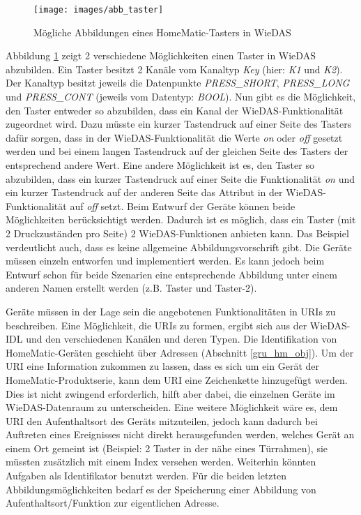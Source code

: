 \begin{figure}[h]
\texttt{[image: images/abb\_taster]}
\caption{Mögliche Abbildungen eines HomeMatic-Tasters in WieDAS}
\label{abb_taster}
\end{figure}

Abbildung \ref{abb_taster} zeigt 2 verschiedene Möglichkeiten einen Taster in WieDAS abzubilden.
Ein Taster besitzt 2 Kanäle vom Kanaltyp \emph{Key} (hier: \emph{K1} und \emph{K2}).
Der Kanaltyp besitzt jeweils die Datenpunkte \emph{PRESS\_SHORT}, \emph{PRESS\_LONG} und
\emph{PRESS\_CONT} \cite{hmscript4} (jeweils vom Datentyp: \emph{BOOL}).
Nun gibt es die Möglichkeit, den Taster entweder so abzubilden, dass ein Kanal der WieDAS-Funktionalität
zugeordnet wird.
Dazu müsste ein kurzer Tastendruck auf einer Seite des Tasters dafür sorgen, dass in der WieDAS-Funktionalität
die Werte \emph{on} oder \emph{off} gesetzt werden und bei einem langen Tastendruck auf der gleichen Seite
des Tasters der entsprechend andere Wert.
Eine andere Möglichkeit ist es, den Taster so abzubilden, dass ein kurzer Tastendruck auf einer Seite
die Funktionalität \emph{on} und ein kurzer Tastendruck auf der anderen Seite das Attribut in der
WieDAS-Funktionalität auf \emph{off} setzt.
Beim Entwurf der Geräte können beide Möglichkeiten berücksichtigt werden.
Dadurch ist es möglich, dass ein Taster (mit 2 Druckzuständen pro Seite) 2 WieDAS-Funktionen anbieten kann.
Das Beispiel verdeutlicht auch, dass es keine allgemeine Abbildungsvorschrift gibt.
Die Geräte müssen einzeln entworfen und implementiert werden.
Es kann jedoch beim Entwurf schon für beide Szenarien eine entsprechende Abbildung unter einem anderen
Namen erstellt werden (z.B. Taster und Taster-2).

Geräte müssen in der Lage sein die angebotenen Funktionalitäten in URIs zu beschreiben.
Eine Möglichkeit, die URIs zu formen, ergibt sich aus der WieDAS-IDL \cite{wiedas_idl}
und den verschiedenen Kanälen und deren Typen.
Die Identifikation von HomeMatic-Geräten geschieht über Adressen (Abschnitt \ref{gru_hm_obj}).
Um der URI eine Information zukommen zu lassen, dass es sich um ein Gerät der HomeMatic-Produktserie,
kann dem URI eine Zeichenkette hinzugefügt werden.
Dies ist nicht zwingend erforderlich, hilft aber dabei, die einzelnen Geräte im WieDAS-Datenraum
zu unterscheiden.
Eine weitere Möglichkeit wäre es, dem URI den Aufenthaltsort des Geräts mitzuteilen, jedoch kann
dadurch bei Auftreten eines Ereignisses nicht direkt herausgefunden werden, welches Gerät
an einem Ort gemeint ist (Beispiel: 2 Taster in der nähe eines Türrahmen), sie müssten zusätzlich
mit einem Index versehen werden.
Weiterhin könnten Aufgaben als Identifikator benutzt werden.
Für die beiden letzten Abbildungsmöglichkeiten bedarf es der Speicherung einer Abbildung
von Aufenthaltsort/Funktion zur eigentlichen Adresse.

